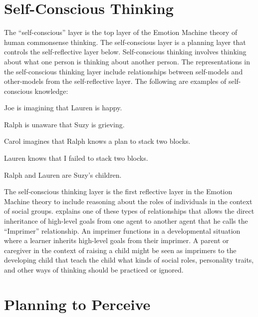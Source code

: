 \section{Self-Conscious Thinking}

The ``self-conscious'' layer is the top layer of the Emotion Machine
theory of human commonsense thinking.  The self-conscious layer is a
planning layer that controls the self-reflective layer below.
Self-conscious thinking involves thinking about what one person is
thinking about another person.  The representations in the
self-conscious thinking layer include relationships between
self-models and other-models from the self-reflective layer.  The
following are examples of self-conscious knowledge:
\begin{packed_itemize}
\item{Joe is imagining that Lauren is happy.}
\item{Ralph is unaware that Suzy is grieving.}
\item{Carol imagines that Ralph knows a plan to stack two blocks.}
\item{Lauren knows that I failed to stack two blocks.}
\item{Ralph and Lauren are Suzy's children.}
\end{packed_itemize}
The self-conscious thinking layer is the first reflective layer in the
Emotion Machine theory to include reasoning about the roles of
individuals in the context of social groups.  \cite{minsky:2006}
explains one of these types of relationships that allows the direct
inheritance of high-level goals from one agent to another agent that
he calls the ``Imprimer'' relationship.  An imprimer functions in a
developmental situation where a learner inherits high-level goals from
their imprimer.  A parent or caregiver in the context of raising a
child might be seen as imprimers to the developing child that teach
the child what kinds of social roles, personality traits, and other
ways of thinking should be practiced or ignored.

\section{Planning to Perceive}

